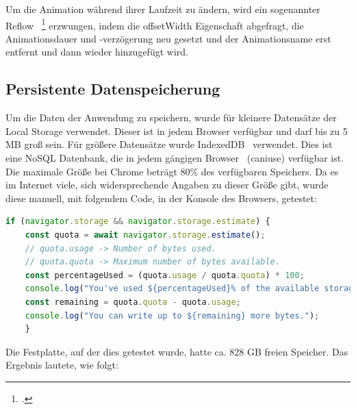 \newline
\newline
Um die Animation während ihrer Laufzeit zu ändern, wird ein sogenannter Reflow ~\footcite{JavaScriptAnimationsReflow} erzwungen, indem die offsetWidth Eigenschaft abgefragt, die Animationsdauer und -verzögerung neu gesetzt und der Animationsname erst entfernt und dann wieder hinzugefügt wird.
\newline
\newline
\subsection{Persistente Datenspeicherung}\label{subsec:persistente-datenspeicherung}
Um die Daten der Anwendung zu speichern, wurde für kleinere Datensätze der Local Storage verwendet.
Dieser ist in jedem Browser verfügbar und darf bis zu 5 MB groß sein.
\newline
\newline
Für größere Datensätze wurde IndexedDB~\cite{IndexedDB} verwendet.
Dies ist eine NoSQL Datenbank, die in jedem gängigen Browser~\cite{caniuse-indexedDB} (\gls{caniuse}) verfügbar ist.
Die maximale Größe bei Chrome beträgt 80\(\%\) des verfügbaren Speichers.
Da es im Internet viele, sich widersprechende Angaben zu dieser Größe gibt, wurde diese manuell, mit folgendem Code, in der Konsole des Browsers, getestet:
\newline
\newline
\begin{lstlisting}[language=JavaScript,label={lst:JavaScript IndexedDB Speichergröße}]
    if (navigator.storage && navigator.storage.estimate) {
    const quota = await navigator.storage.estimate();
    // quota.usage -> Number of bytes used.
    // quota.quota -> Maximum number of bytes available.
    const percentageUsed = (quota.usage / quota.quota) * 100;
    console.log("You've used ${percentageUsed}% of the available storage.");
    const remaining = quota.quota - quota.usage;
    console.log("You can write up to ${remaining} more bytes.");
    }
\end{lstlisting}
\newline
\newline
Die Festplatte, auf der dies getestet wurde, hatte ca. 828 GB freien Speicher.
Das Ergebnis lautete, wie folgt:
\newline
